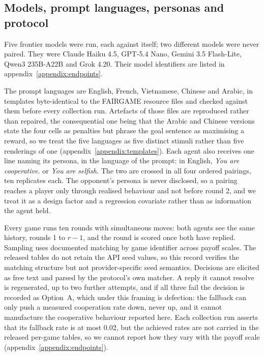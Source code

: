 \documentclass[openacc]{rsproca_new}
\begin{document}
\subsection{Models, prompt languages, personas and protocol}\label{sec:protocol}

Five frontier models were run, each against itself; two different models were
never paired. They were Claude Haiku 4.5, GPT-5.4 Nano, Gemini 3.5 Flash-Lite,
Qwen3 235B-A22B and Grok 4.20. Their model identifiers are listed in
appendix~\ref{appendix:endpoints}.

The prompt languages are English, French, Vietnamese, Chinese and Arabic, in
templates byte-identical to the FAIRGAME resource files and checked against
them before every collection run. Artefacts of those files are reproduced
rather than repaired, the consequential one being that the Arabic and Chinese
versions state the four cells as penalties but phrase the goal sentence as
maximising a reward, so we treat the five languages as five distinct stimuli
rather than five renderings of one (appendix~\ref{appendix:templates}). Each
agent also receives one line naming its persona, in the language of the prompt:
in English, \emph{You are cooperative.} or \emph{You are selfish.} The two are
crossed in all four ordered pairings, ten replicates each. The opponent's
persona is never disclosed, so a pairing reaches a player only through realised
behaviour and not before round 2, and we treat it as a design factor and a
regression covariate rather than as information the agent held.

Every game runs ten rounds with simultaneous moves: both agents see the same
history, rounds 1 to $r-1$, and the round is scored once both have replied.
Sampling uses documented matching by game identifier across payoff scales.
The released tables do not retain the API seed values, so this record verifies
the matching structure but not provider-specific seed semantics. Decisions are elicited
as free text and parsed by the protocol's own matcher. A reply it cannot
resolve is regenerated, up to two further attempts, and if all three fail the
decision is recorded as Option~A, which under this framing is defection: the
fallback can only push a measured cooperation rate down, never up, and it
cannot manufacture the cooperative behaviour reported here. Each collection run
asserts that its fallback rate is at most 0.02, but the achieved rates are not
carried in the released per-game tables, so we cannot report how they vary with
the payoff scale (appendix~\ref{appendix:endpoints}).
\end{document}
